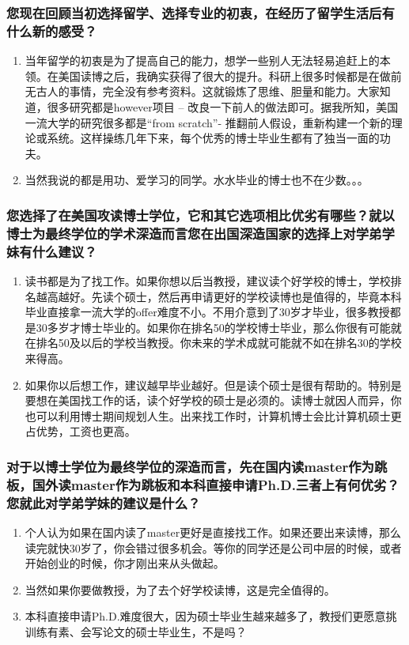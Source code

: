 \documentclass[a4paper,UTF8]{book}
\begin{document}
    \subsubsection*{您现在回顾当初选择留学、选择专业的初衷，在经历了留学生活后有什么新的感受？}
        \begin{enumerate}[itemindent=0pt,itemsep=0pt,parsep=0pt]
            \item 当年留学的初衷是为了提高自己的能力，想学一些别人无法轻易追赶上的本领。在美国读博之后，我确实获得了很大的提升。科研上很多时候都是在做前无古人的事情，完全没有参考资料。这就锻炼了思维、胆量和能力。大家知道，很多研究都是however项目 – 改良一下前人的做法即可。据我所知，美国一流大学的研究很多都是“from scratch”- 推翻前人假设，重新构建一个新的理论或系统。这样操练几年下来，每个优秀的博士毕业生都有了独当一面的功夫。
            \item 当然我说的都是用功、爱学习的同学。水水毕业的博士也不在少数。。。
        \end{enumerate}
    \subsubsection*{您选择了在美国攻读博士学位，它和其它选项相比优劣有哪些？就以博士为最终学位的学术深造而言您在出国深造国家的选择上对学弟学妹有什么建议？}
        \begin{enumerate}[itemindent=0pt,itemsep=0pt,parsep=0pt]
            \item 读书都是为了找工作。如果你想以后当教授，建议读个好学校的博士，学校排名越高越好。先读个硕士，然后再申请更好的学校读博也是值得的，毕竟本科毕业直接拿一流大学的offer难度不小。不用介意到了30岁才毕业，很多教授都是30多岁才博士毕业的。如果你在排名50的学校博士毕业，那么你很有可能就在排名50及以后的学校当教授。你未来的学术成就可能就不如在排名30的学校来得高。
            \item 如果你以后想工作，建议越早毕业越好。但是读个硕士是很有帮助的。特别是要想在美国找工作的话，读个好学校的硕士是必须的。读博士就因人而异，你也可以利用博士期间规划人生。出来找工作时，计算机博士会比计算机硕士更占优势，工资也更高。
        \end{enumerate}
    \subsubsection*{对于以博士学位为最终学位的深造而言，先在国内读master作为跳板，国外读master作为跳板和本科直接申请Ph.D.三者上有何优劣？您就此对学弟学妹的建议是什么？}
        \begin{enumerate}[itemindent=0pt,itemsep=0pt,parsep=0pt]
            \item 个人认为如果在国内读了master更好是直接找工作。如果还要出来读博，那么读完就快30岁了，你会错过很多机会。等你的同学还是公司中层的时候，或者开始创业的时候，你才刚出来从头做起。
            \item 当然如果你要做教授，为了去个好学校读博，这是完全值得的。
            \item 本科直接申请Ph.D.难度很大，因为硕士毕业生越来越多了，教授们更愿意挑训练有素、会写论文的硕士毕业生，不是吗？
        \end{enumerate}
\end{document}
